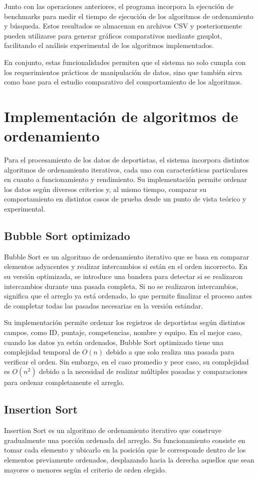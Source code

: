 Junto con las operaciones anteriores, el programa incorpora la ejecución de benchmarks para medir el tiempo de ejecución de los algoritmos de ordenamiento y búsqueda. Estos resultados se almacenan en archivos CSV y posteriormente pueden utilizarse para generar gráficos comparativos mediante gnuplot, facilitando el análisis experimental de los algoritmos implementados.

En conjunto, estas funcionalidades permiten que el sistema no solo cumpla con los requerimientos prácticos de manipulación de datos, sino que también sirva como base para el estudio comparativo del comportamiento de los algoritmos.
\section{Implementación de algoritmos de ordenamiento}
Para el procesamiento de los datos de deportistas, el sistema incorpora distintos algoritmos de ordenamiento iterativos, cada uno con características particulares en cuanto a funcionamiento y rendimiento. Su implementación permite ordenar los datos según diversos criterios y, al mismo tiempo, comparar su comportamiento en distintos casos de prueba desde un punto de vista teórico y experimental.


\subsection{Bubble Sort optimizado}\label{subsec:bubblesort}
Bubble Sort es un algoritmo de ordenamiento iterativo que se basa en comparar elementos adyacentes y realizar intercambios si están en el orden incorrecto. En su versión optimizada, se introduce una bandera para detectar si se realizaron intercambios durante una pasada completa. Si no se realizaron intercambios, significa que el arreglo ya está ordenado, lo que permite finalizar el proceso antes de completar todas las pasadas necesarias en la versión estándar.

Su implementación permite ordenar los registros de deportistas según distintos campos, como ID, puntaje, competencias, nombre y equipo. En el mejor caso, cuando los datos ya están ordenados, Bubble Sort optimizado tiene una complejidad temporal de \(O(n)\) debido a que solo realiza una pasada para verificar el orden. Sin embargo, en el caso promedio y peor caso, su complejidad es \(O(n^2)\) debido a la necesidad de realizar múltiples pasadas y comparaciones para ordenar completamente el arreglo.

\subsection{Insertion Sort}
Insertion Sort es un algoritmo de ordenamiento iterativo que construye gradualmente una porción ordenada del arreglo. Su funcionamiento consiste en tomar cada elemento y ubicarlo en la posición que le corresponde dentro de los elementos previamente ordenados, desplazando hacia la derecha aquellos que sean mayores o menores según el criterio de orden elegido.

